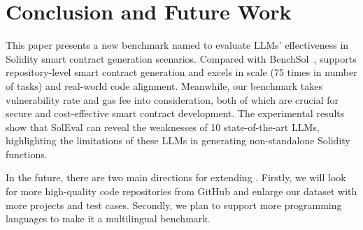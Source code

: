 \section{Conclusion and Future Work}


This paper presents a new benchmark named \datasetname to evaluate LLMs' effectiveness in Solidity smart contract generation scenarios.
Compared with BenchSol~\cite{benchmark2024sol}, \mytitle supports repository-level smart contract generation and excels in scale (75 times in number of tasks) and real-world code alignment.
Meanwhile, our benchmark takes vulnerability rate and gas fee into consideration, both of which are crucial for secure and cost-effective smart contract development.
The experimental results show that SolEval can reveal the weaknesses of 10 state-of-the-art LLMs, highlighting the limitations of these LLMs in generating non-standalone Solidity functions.


In the future, there are two main directions for extending \mytitle. 
Firstly, we will look for more high-quality code repositories from GitHub and enlarge our dataset with more projects and test cases. 
Secondly, we plan to support more programming languages to make it a multilingual benchmark.